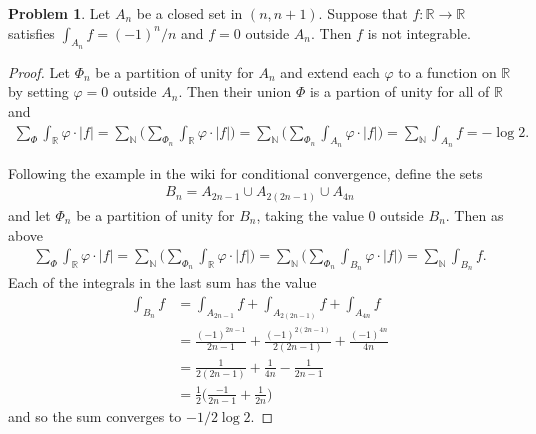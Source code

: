 \documentclass[20pt]{article}
\theoremstyle{plain}
\theoremstyle{definition}
\newtheorem*{problem}{Problem}
\newcommand{\reals}{\mathbb{R}}
\newcommand{\naturals}{\mathbb{N}}
\begin{document}
\begin{problem}{3.38}
  Let $A_n$ be a closed set in $(n, n+1)$. Suppose that $f: \reals \to \reals$
  satisfies $\int_{A_n}f = (-1)^n/n$ and $f=0$ outside $A_n.$ 
  Then $f$ is not integrable.
\end{problem}

\begin{proof}
  Let $\Phi_n$ be a partition of unity for $A_n$ and extend each 
  $\varphi$ to a function on $\mathbb{R}$ by setting $\varphi=0$ outside 
  $A_n$.
  Then their union $\Phi$ is a partion of unity for all of $\mathbb{R}$
  and 
  \begin{align*}
    \sum_\Phi \int_\mathbb{R} \varphi \cdot |f| = 
    \sum_\naturals \bigg( \sum_{\Phi_n} \int_\reals \varphi \cdot |f| \bigg) = 
    \sum_\naturals \bigg( \sum_{\Phi_n} \int_{A_n} \varphi \cdot |f| \bigg) = 
    \sum_\naturals \int_{A_n}f = -\log 2.
  \end{align*}

  Following the example in the wiki for conditional convergence, 
  define the sets 
  \begin{align*}
    B_n = A_{2n - 1} \cup A_{2(2n-1)} \cup A_{4n}
  \end{align*}
  and let $\Phi_n$ be a partition of unity for $B_n$, taking the 
  value $0$ outside $B_n$.  Then as above
  \begin{align*}
    \sum_\Phi \int_\reals \varphi \cdot |f| = 
    \sum_\naturals \bigg(\sum_{\Phi_n} \int_\reals \varphi \cdot |f| \bigg) = 
    \sum_\naturals \bigg(\sum_{\Phi_n} \int_{B_n} \varphi \cdot |f| \bigg) = 
    \sum_\naturals \int_{B_n}f.
  \end{align*} 
  Each of the integrals in the last sum has the value 
  \begin{align*}
    \int_{B_n}f
    &= \int_{A_{2n-1}}f + \int_{A_{2(2n-1)}}f + \int_{A_{4n}}f \\
    &=  \frac{(-1)^{2n-1}}{2n-1} + 
        \frac{(-1)^{2(2n-1)}}{2(2n-1)} + 
        \frac{(-1)^{4n}}{4n} \\
    &=  \frac{1}{2(2n-1)} +
        \frac{1}{4n} -
        \frac{1}{2n-1} \\
    &= \frac{1}{2} \bigg(
     \frac{-1}{2n-1} + \frac{1}{2n} \bigg)
  \end{align*}
  and so the sum converges to $-1/2 \log 2.$
\end{proof}
\end{document}
